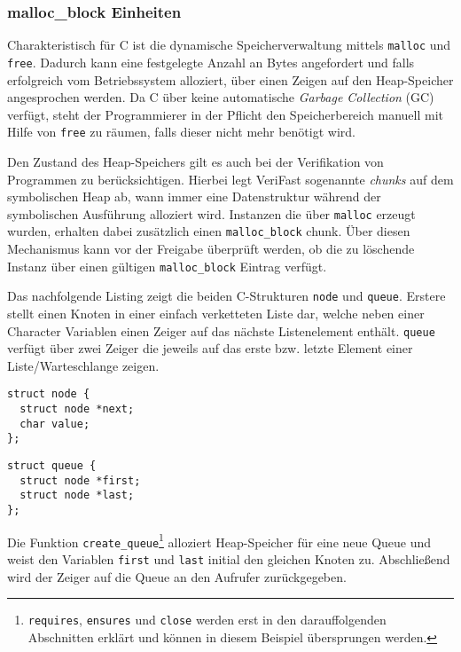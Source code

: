 \subsubsection{malloc\_block Einheiten}
\label{subsubsuc:malloc}

Charakteristisch für C ist die dynamische Speicherverwaltung mittels \texttt{malloc} und \texttt{free}. Dadurch kann eine festgelegte Anzahl an Bytes angefordert und falls erfolgreich vom Betriebssystem alloziert, über einen Zeigen auf den Heap-Speicher angesprochen werden. Da C über keine automatische \emph{Garbage Collection} (GC) verfügt, steht der Programmierer in der Pflicht den Speicherbereich manuell mit Hilfe von \texttt{free} zu räumen, falls dieser nicht mehr benötigt wird.

Den Zustand des Heap-Speichers gilt es auch bei der Verifikation von Programmen zu berücksichtigen. Hierbei legt VeriFast sogenannte \emph{chunks} auf dem symbolischen Heap ab, wann immer eine Datenstruktur während der symbolischen Ausführung alloziert wird. Instanzen die über \texttt{malloc} erzeugt wurden, erhalten dabei zusätzlich einen \texttt{malloc\_block} chunk. Über diesen Mechanismus kann vor der Freigabe überprüft werden, ob die zu löschende Instanz über einen gültigen \texttt{malloc\_block} Eintrag verfügt. \cite{Jacobs2008,Jacobs2010}

Das nachfolgende Listing zeigt die beiden C-Strukturen \texttt{node} und \texttt{queue}. Erstere stellt einen Knoten in einer einfach verketteten Liste dar, welche neben einer Character Variablen einen Zeiger auf das nächste Listenelement enthält. \texttt{queue} verfügt über zwei Zeiger die jeweils auf das erste bzw. letzte Element einer Liste/Warteschlange zeigen.

\vspace{-10pt}
{\noindent
\begin{minipage}[t]{.45\textwidth}
\begin{lstlisting}
struct node {
  struct node *next;
  char value;
};
\end{lstlisting}
\end{minipage}
\hfill
\begin{minipage}[t]{.45\textwidth}
\begin{lstlisting}
struct queue {
  struct node *first;
  struct node *last;
};
\end{lstlisting}
\end{minipage}
}

\noindent
Die Funktion \texttt{create\_queue}\footnote{\texttt{requires}, \texttt{ensures} und \texttt{close} werden erst in den darauffolgenden Abschnitten erklärt und können in diesem Beispiel übersprungen werden.} alloziert Heap-Speicher für eine neue Queue und weist den Variablen \texttt{first} und \texttt{last} initial den gleichen Knoten zu. Abschließend wird der Zeiger auf die Queue an den Aufrufer zurückgegeben. 

